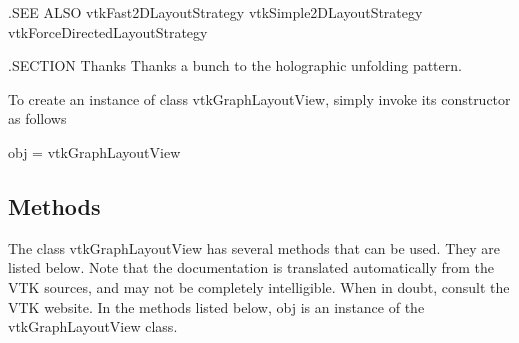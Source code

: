 .S\-E\-E A\-L\-S\-O vtk\-Fast2\-D\-Layout\-Strategy vtk\-Simple2\-D\-Layout\-Strategy vtk\-Force\-Directed\-Layout\-Strategy

.S\-E\-C\-T\-I\-O\-N Thanks Thanks a bunch to the holographic unfolding pattern.

To create an instance of class vtk\-Graph\-Layout\-View, simply invoke its constructor as follows \begin{DoxyVerb}  obj = vtkGraphLayoutView
\end{DoxyVerb}
 \hypertarget{vtkwidgets_vtkxyplotwidget_Methods}{}\subsection{Methods}\label{vtkwidgets_vtkxyplotwidget_Methods}
The class vtk\-Graph\-Layout\-View has several methods that can be used. They are listed below. Note that the documentation is translated automatically from the V\-T\-K sources, and may not be completely intelligible. When in doubt, consult the V\-T\-K website. In the methods listed below, {\ttfamily obj} is an instance of the vtk\-Graph\-Layout\-View class. 
